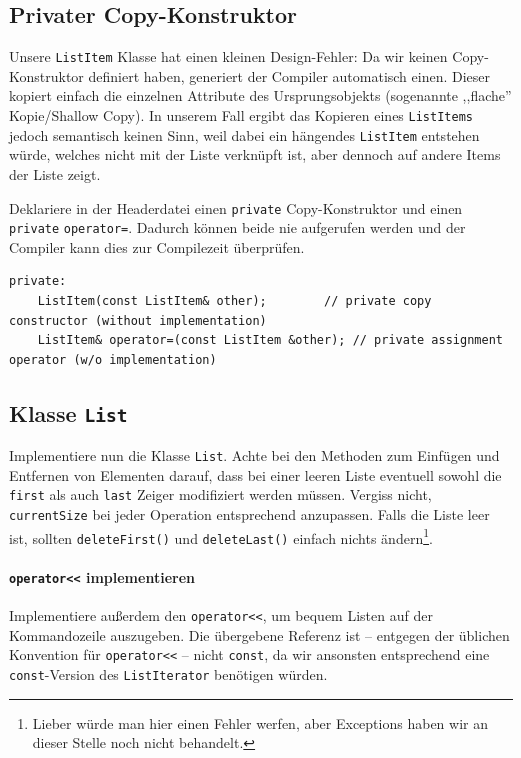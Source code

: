 \subsection{Privater Copy-Konstruktor}
Unsere \lstinline{ListItem} Klasse hat einen kleinen Design-Fehler:
Da wir keinen Copy-Konstruktor definiert haben, generiert der Compiler automatisch einen.
Dieser kopiert einfach die einzelnen Attribute des Ursprungsobjekts (sogenannte ,,flache'' Kopie/Shallow Copy).
In unserem Fall ergibt das Kopieren eines \lstinline{ListItems} jedoch semantisch keinen Sinn, weil dabei ein hängendes \lstinline{ListItem} entstehen würde, welches nicht mit der Liste verknüpft ist, aber dennoch auf andere Items der Liste zeigt.

Deklariere in der Headerdatei einen \lstinline{private} Copy-Konstruktor und einen \lstinline{private} \lstinline{operator=}.
Dadurch können beide nie aufgerufen werden und der Compiler kann dies zur Compilezeit überprüfen.

\begin{lstlisting}
private:
	ListItem(const ListItem& other);		// private copy constructor (without implementation)
	ListItem& operator=(const ListItem &other);	// private assignment operator (w/o implementation)
\end{lstlisting}


\subsection{Klasse \lstinline{List}}
Implementiere nun die Klasse \lstinline{List}.
Achte bei den Methoden zum Einfügen und Entfernen von Elementen darauf, dass bei einer leeren Liste eventuell sowohl die \lstinline{first} als auch \lstinline{last} Zeiger modifiziert werden müssen.
Vergiss nicht, \lstinline{currentSize} bei jeder Operation entsprechend anzupassen.
Falls die Liste leer ist, sollten \lstinline{deleteFirst()} und \lstinline{deleteLast()} einfach nichts ändern\footnote{Lieber würde man hier einen Fehler werfen, aber Exceptions haben wir an dieser Stelle noch nicht behandelt.}.

\paragraph{\lstinline{operator<<} implementieren}
Implementiere außerdem den \lstinline{operator<<}, um bequem Listen auf der Kommandozeile auszugeben.
Die übergebene Referenz ist -- entgegen der üblichen Konvention für \lstinline{operator<<} -- nicht \lstinline{const}, da wir ansonsten entsprechend eine \lstinline{const}-Version des  \lstinline{ListIterator} benötigen würden.

